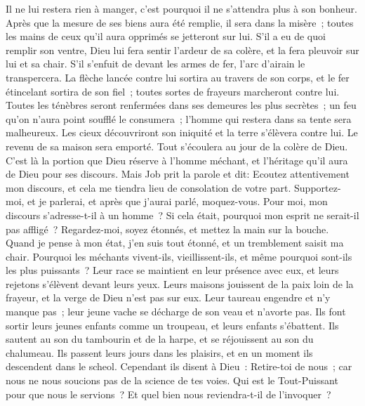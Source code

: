 \begin{multicols}{2}
Il ne lui restera rien à manger, c'est pourquoi il ne s'attendra plus à son bonheur.
Après que la mesure de ses biens aura été remplie, il sera dans la misère~; toutes les mains de ceux qu'il aura opprimés se jetteront sur lui.
S'il a eu de quoi remplir son ventre, Dieu lui fera sentir l'ardeur de sa colère, et la fera pleuvoir sur lui et sa chair.
S'il s'enfuit de devant les armes de fer, l'arc d'airain le transpercera.
La flèche lancée contre lui sortira au travers de son corps, et le fer étincelant sortira de son fiel~; toutes sortes de frayeurs marcheront contre lui.
Toutes les ténèbres seront renfermées dans ses demeures les plus secrètes~; un feu qu'on n'aura point soufflé le consumera~; l'homme qui restera dans sa tente sera malheureux.
Les cieux découvriront son iniquité et la terre s'élèvera contre lui. 
Le revenu de sa maison sera emporté. Tout s'écoulera au jour de la colère de Dieu.
C'est là la portion que Dieu réserve à l'homme méchant, et l'héritage qu'il aura de Dieu pour ses discours.
\VerseOne{}Mais Job prit la parole et dit: 
Ecoutez attentivement mon discours, et cela me tiendra lieu de consolation de votre part. 
Supportez-moi, et je parlerai, et après que j'aurai parlé, moquez-vous. 
Pour moi, mon discours s'adresse-t-il à un homme~? Si cela était, pourquoi mon esprit ne serait-il pas affligé~?
Regardez-moi, soyez étonnés, et mettez la main sur la bouche.
Quand je pense à mon état, j'en suis tout étonné, et un tremblement saisit ma chair.
Pourquoi les méchants vivent-ils, vieillissent-ils, et même pourquoi sont-ils les plus puissants~?
Leur race se maintient en leur présence avec eux, et leurs rejetons s'élèvent devant leurs yeux.
Leurs maisons jouissent de la paix loin de la frayeur, et la verge de Dieu n'est pas sur eux. 
Leur taureau engendre et n'y manque pas~; leur jeune vache se décharge de son veau et n'avorte pas.
Ils font sortir leurs jeunes enfants comme un troupeau, et leurs enfants s'ébattent. 
Ils sautent au son du tambourin et de la harpe, et se réjouissent au son du chalumeau. 
Ils passent leurs jours dans les plaisirs, et en un moment ils descendent dans le scheol.
 Cependant ils disent à Dieu~: Retire-toi de nous~; car nous ne nous soucions pas de la science de tes voies. 
Qui est le Tout-Puissant pour que nous le servions~? Et quel bien nous reviendra-t-il de l'invoquer~?

\end{multicols}

